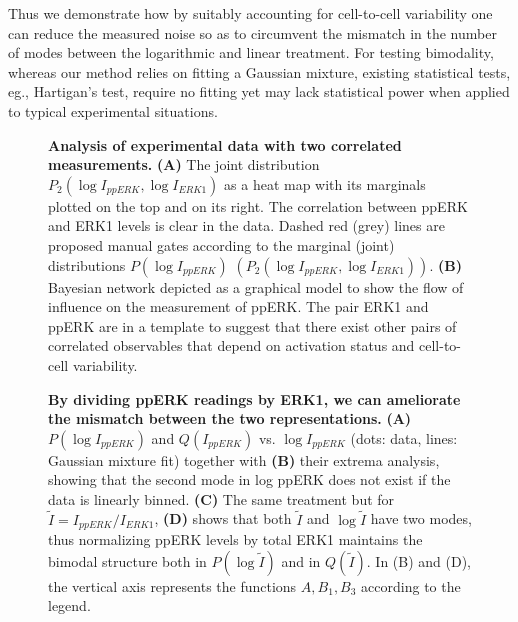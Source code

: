 \documentclass[11pt,a4paper,draft]{article}
\begin{document}
Thus we demonstrate how by suitably accounting for cell-to-cell variability one can reduce the measured noise so as to circumvent the mismatch in the number of modes between the logarithmic and linear treatment. For testing bimodality, whereas our method relies on fitting a Gaussian mixture, existing statistical tests, eg., Hartigan's test, require no fitting yet may lack statistical power when applied to typical experimental situations. 
\smallskip

\begin{figure}
    \centering
   \caption{\textbf{Analysis of experimental data with two correlated measurements.} \textbf{(A)} The joint distribution $P_2(\log I_{ppERK},\log I_{ERK1})$ as a heat map with its marginals plotted on the top and on its right. The correlation between ppERK and ERK1 levels is clear in the data. Dashed red (grey) lines are proposed manual gates according to the marginal (joint) distributions $P(\log I_{ppERK})$ $\left(P_2(\log I_{ppERK},\log I_{ERK1})\right)$. \textbf{(B)} Bayesian network depicted as a graphical model to show the flow of influence on the measurement of ppERK. The pair ERK1 and ppERK are in a template to suggest that there exist other pairs of correlated observables that depend on activation status and cell-to-cell variability.}
   \label{fig:ppERKvsERK1heatmap}
\end{figure}



\smallskip
\begin{figure}
 \centering
  \caption{\textbf{By dividing ppERK readings by ERK1, we can ameliorate the mismatch between the two representations.} \textbf{(A)} $P(\log I_{ppERK})$ and $Q(I_{ppERK})$ vs. $\log I_{ppERK}$ (dots: data, lines: Gaussian mixture fit) together with \textbf{(B)} their extrema analysis, showing that the second mode in log ppERK does not exist if the data is linearly binned. \textbf{(C)} The same treatment but for $\tilde{I} = I_{ppERK}/I_{ERK1}$, \textbf{(D)} shows that both $\tilde{I}$ and $\log \tilde{I}$ have two modes, thus normalizing ppERK levels by total ERK1 maintains the bimodal structure both in $P(\log \tilde{I})$ and in $Q(\tilde{I})$. In (B) and (D), the vertical axis represents the functions $A, B_1,B_3$ according to the legend.}
  \label{fig:NormppERKbyERK}
\end{figure}

\smallskip
\end{document}
